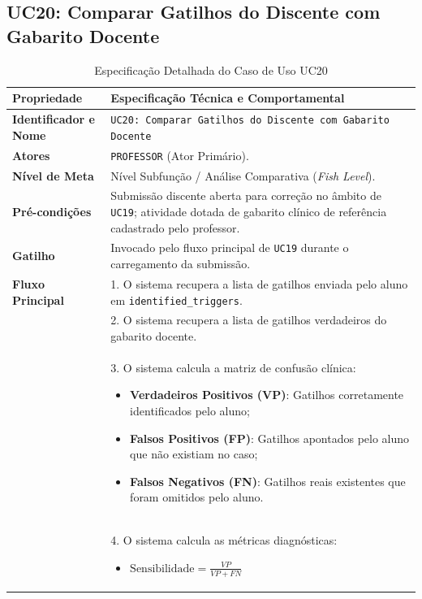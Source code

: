 \subsection{UC20: Comparar Gatilhos do Discente com Gabarito Docente}
\label{uc20_especificacao}

\begin{table}[!ht]
\centering
\caption{Especificação Detalhada do Caso de Uso UC20}
\label{tab_uc20}
\footnotesize
\begin{tabularx}{\textwidth}{p{3.5cm} X}
\toprule
\textbf{Propriedade} & \textbf{Especificação Técnica e Comportamental} \\
\midrule
\textbf{Identificador e Nome} & \texttt{UC20: Comparar Gatilhos do Discente com Gabarito Docente} \\
\textbf{Atores} & \texttt{PROFESSOR} (Ator Primário). \\
\textbf{Nível de Meta} & Nível Subfunção / Análise Comparativa (\textit{Fish Level}). \\
\textbf{Pré-condições} & Submissão discente aberta para correção no âmbito de \texttt{UC19}; atividade dotada de gabarito clínico de referência cadastrado pelo professor. \\
\textbf{Gatilho} & Invocado pelo fluxo principal de \texttt{UC19} durante o carregamento da submissão. \\
\textbf{Fluxo Principal} & 
1. O sistema recupera a lista de gatilhos enviada pelo aluno em \texttt{identified\_triggers}.\\
& 2. O sistema recupera a lista de gatilhos verdadeiros do gabarito docente.\\
& 3. O sistema calcula a matriz de confusão clínica:
\begin{itemize}
    \item \textbf{Verdadeiros Positivos (VP)}: Gatilhos corretamente identificados pelo aluno;
    \item \textbf{Falsos Positivos (FP)}: Gatilhos apontados pelo aluno que não existiam no caso;
    \item \textbf{Falsos Negativos (FN)}: Gatilhos reais existentes que foram omitidos pelo aluno.
\end{itemize}\\
& 4. O sistema calcula as métricas diagnósticas:
\begin{itemize}
    \item $\text{Sensibilidade} = \frac{VP}{VP + FN}$

\end{itemize}
\end{tabularx}
\end{table}
